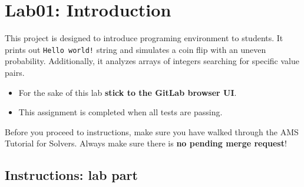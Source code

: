 \chapter{Lab01: Introduction}\label{apx:lab01}

This project is designed to introduce programing environment to students. It prints out \texttt{Hello\ world!} string and simulates a coin flip with an uneven probability. Additionally, it analyzes arrays of integers searching for specific value pairs.

\begin{itemize}
\item
  For the sake of this lab \textbf{stick to the GitLab browser UI}.
\item
  This assignment is completed when all tests are passing.
\end{itemize}

Before you proceed to instructions, make sure you have walked through the AMS Tutorial for Solvers. Always make sure there is \textbf{no pending merge request}!

\section{Instructions: lab part}\label{lab01-instructions-lab-part}

